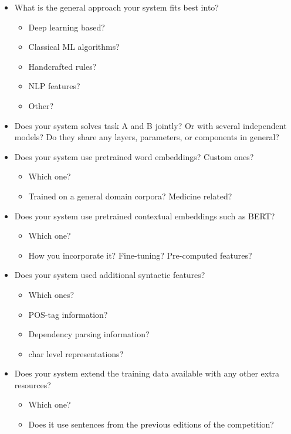 \documentclass[
]{ceurart}
\begin{document}
\begin{itemize}
    \item What is the general approach your system fits best into?
        \begin{itemize}
            \item Deep learning based?
            \item Classical ML algorithms?
            \item Handcrafted rules?
            \item NLP features?
            \item Other?
        \end{itemize} 
    \item Does your system solves task A and B jointly? Or with several independent models? Do they share any layers, parameters, or components in general?
    \item Does your system use pretrained word embeddings? Custom ones?
        \begin{itemize}
            \item Which one?
            \item Trained on a general domain corpora? Medicine related?
        \end{itemize}
    \item Does your system use pretrained contextual embeddings such as BERT?
        \begin{itemize}
            \item Which one?
            \item How you incorporate it? Fine-tuning? Pre-computed features?
        \end{itemize}
    \item Does your system used additional syntactic features?
        \begin{itemize}
            \item Which ones?
            \item POS-tag information?
            \item Dependency parsing information?
            \item char level representations?
        \end{itemize}
    \item Does your system extend the training data available with any other extra resources?
        \begin{itemize}
            \item Which one?
            \item Does it use sentences from the previous editions of the competition?

\end{itemize}
\end{itemize}
\end{document}
